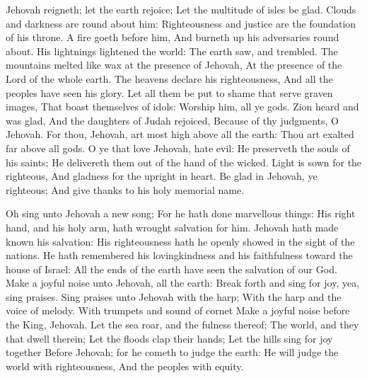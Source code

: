 Jehovah reigneth; let the earth rejoice; Let the multitude of isles be glad.  Clouds and darkness are round about him: Righteousness and justice are the foundation of his throne.  A fire goeth before him, And burneth up his adversaries round about.  His lightnings lightened the world: The earth saw, and trembled.  The mountains melted like wax at the presence of Jehovah, At the presence of the Lord of the whole earth.  The heavens declare his righteousness, And all the peoples have seen his glory.  Let all them be put to shame that serve graven images, That boast themselves of idols: Worship him, all ye gods.  Zion heard and was glad, And the daughters of Judah rejoiced, Because of thy judgments, O Jehovah.  For thou, Jehovah, art most high above all the earth: Thou art exalted far above all gods.  O ye that love Jehovah, hate evil: He preserveth the souls of his saints; He delivereth them out of the hand of the wicked.  Light is sown for the righteous, And gladness for the upright in heart.  Be glad in Jehovah, ye righteous; And give thanks to his holy memorial name. 

Oh sing unto Jehovah a new song; For he hath done marvellous things: His right hand, and his holy arm, hath wrought salvation for him.  Jehovah hath made known his salvation: His righteousness hath he openly showed in the sight of the nations.  He hath remembered his lovingkindness and his faithfulness toward the house of Israel: All the ends of the earth have seen the salvation of our God.  Make a joyful noise unto Jehovah, all the earth: Break forth and sing for joy, yea, sing praises.  Sing praises unto Jehovah with the harp; With the harp and the voice of melody.  With trumpets and sound of cornet Make a joyful noise before the King, Jehovah.  Let the sea roar, and the fulness thereof; The world, and they that dwell therein;  Let the floods clap their hands; Let the hills sing for joy together  Before Jehovah; for he cometh to judge the earth: He will judge the world with righteousness, And the peoples with equity. 

